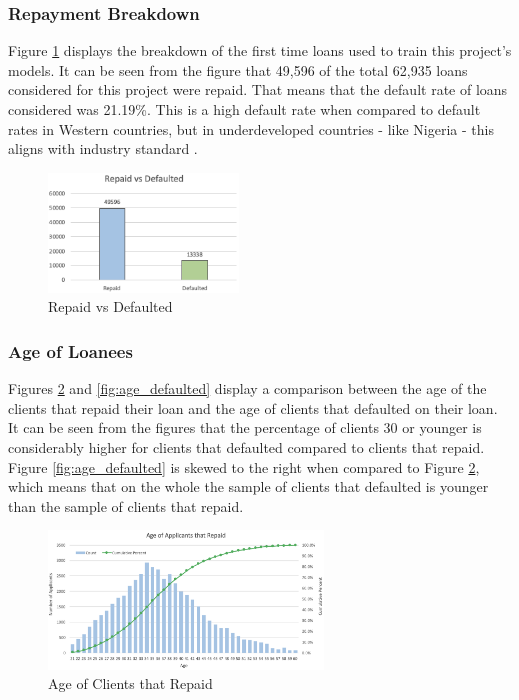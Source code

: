 \subsubsection{Repayment Breakdown}

Figure \ref{fig:defaulted} displays the breakdown of the first time loans used to train this project's models. It can be seen from the figure that 49,596 of the total 62,935 loans considered for this project were repaid. That means that the default rate of loans considered was 21.19\%. This is a high default rate when compared to default rates in Western countries, but in underdeveloped countries - like Nigeria - this aligns with industry standard \parencite{Default}.

\vspace{10 pt}

\begin{figure}[!htb]
\centering
\includegraphics[width=0.45\textwidth]{images/payments.png}
\caption{Repaid vs Defaulted}
\label{fig:defaulted}
\end{figure}

\subsubsection{Age of Loanees}

Figures \ref{fig:age_paid} and \ref{fig:age_defaulted} display a comparison between the age of the clients that repaid their loan and the age of clients that defaulted on their loan. It can be seen from the figures that the percentage of clients 30 or younger is considerably higher for clients that defaulted compared to clients that repaid. Figure \ref{fig:age_defaulted} is skewed to the right when compared to Figure \ref{fig:age_paid}, which means that on the whole the sample of clients that defaulted is younger than the sample of clients that repaid.   

\vspace{10 pt}

\begin{figure}[!htb]
\centering
\includegraphics[width=0.65\textwidth]{images/repaid_age.png}
\caption{Age of Clients that Repaid}
\label{fig:age_paid}
\end{figure}

